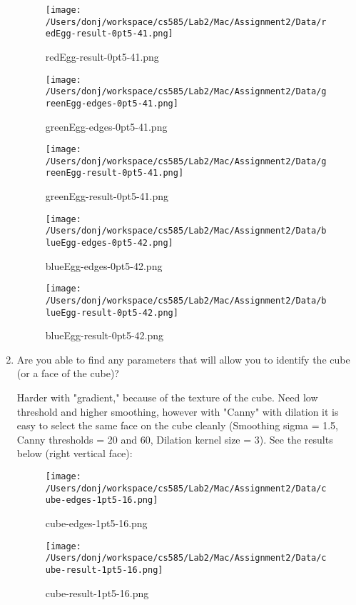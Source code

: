 \documentclass{article}
\begin{document}
\begin{enumerate}
\begin{figure}[H]
\centering
\texttt{[image: /Users/donj/workspace/cs585/Lab2/Mac/Assignment2/Data/redEgg-result-0pt5-41.png]}
\caption{redEgg-result-0pt5-41.png}
\label{overflow}
\end{figure}

\begin{figure}[H]
\centering
\texttt{[image: /Users/donj/workspace/cs585/Lab2/Mac/Assignment2/Data/greenEgg-edges-0pt5-41.png]}
\caption{greenEgg-edges-0pt5-41.png}
\label{overflow}
\end{figure}

\begin{figure}[H]
\centering
\texttt{[image: /Users/donj/workspace/cs585/Lab2/Mac/Assignment2/Data/greenEgg-result-0pt5-41.png]}
\caption{greenEgg-result-0pt5-41.png}
\label{overflow}
\end{figure}

\begin{figure}[H]
\centering
\texttt{[image: /Users/donj/workspace/cs585/Lab2/Mac/Assignment2/Data/blueEgg-edges-0pt5-42.png]}
\caption{blueEgg-edges-0pt5-42.png}
\label{overflow}
\end{figure}

\begin{figure}[H]
\centering
\texttt{[image: /Users/donj/workspace/cs585/Lab2/Mac/Assignment2/Data/blueEgg-result-0pt5-42.png]}
\caption{blueEgg-result-0pt5-42.png}
\label{overflow}
\end{figure}

\item
Are you able to find any parameters that will allow you to identify the cube (or a face of the cube)? 

Harder with "gradient," because of the texture of the cube. Need low threshold and higher smoothing, however with "Canny" with dilation it is easy to select the same face on the cube cleanly (Smoothing sigma = 1.5, Canny thresholds = 20 and 60, Dilation kernel size = 3). See the results below (right vertical face):

\begin{figure}[H]
\centering
\texttt{[image: /Users/donj/workspace/cs585/Lab2/Mac/Assignment2/Data/cube-edges-1pt5-16.png]}
\caption{cube-edges-1pt5-16.png}
\label{overflow}
\end{figure}

\begin{figure}[H]
\centering
\texttt{[image: /Users/donj/workspace/cs585/Lab2/Mac/Assignment2/Data/cube-result-1pt5-16.png]}
\caption{cube-result-1pt5-16.png}
\label{overflow}
\end{figure}


\end{enumerate}
\end{document}
